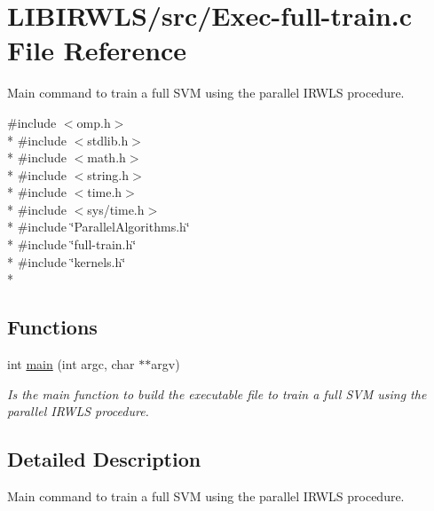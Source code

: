 \hypertarget{Exec-full-train_8c}{}\section{L\+I\+B\+I\+R\+W\+L\+S/src/\+Exec-\/full-\/train.c File Reference}
\label{Exec-full-train_8c}


Main command to train a full S\+VM using the parallel I\+R\+W\+LS procedure.  


{\ttfamily \#include $<$omp.\+h$>$}\\*
{\ttfamily \#include $<$stdlib.\+h$>$}\\*
{\ttfamily \#include $<$math.\+h$>$}\\*
{\ttfamily \#include $<$string.\+h$>$}\\*
{\ttfamily \#include $<$time.\+h$>$}\\*
{\ttfamily \#include $<$sys/time.\+h$>$}\\*
{\ttfamily \#include \char`\"{}Parallel\+Algorithms.\+h\char`\"{}}\\*
{\ttfamily \#include \char`\"{}full-\/train.\+h\char`\"{}}\\*
{\ttfamily \#include \char`\"{}kernels.\+h\char`\"{}}\\*
\subsection*{Functions}
\begin{DoxyCompactItemize}
\item 
\hypertarget{Exec-full-train_8c_a3c04138a5bfe5d72780bb7e82a18e627}{}\label{Exec-full-train_8c_a3c04138a5bfe5d72780bb7e82a18e627} 
int \hyperlink{Exec-full-train_8c_a3c04138a5bfe5d72780bb7e82a18e627}{main} (int argc, char $\ast$$\ast$argv)
\begin{DoxyCompactList}\small\item\em Is the main function to build the executable file to train a full S\+VM using the parallel I\+R\+W\+LS procedure. \end{DoxyCompactList}\end{DoxyCompactItemize}


\subsection{Detailed Description}
Main command to train a full S\+VM using the parallel I\+R\+W\+LS procedure. 


